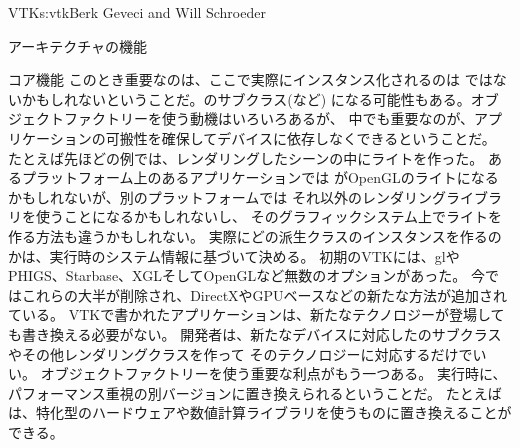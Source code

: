 \begin{aosachapter}{VTK}{s:vtk}{Berk Geveci and Will Schroeder}
\begin{aosasect1}{アーキテクチャの機能}
\begin{aosasect2}{コア機能}
このとき重要なのは、ここで実際にインスタンス化されるのは
ではないかもしれないということだ。のサブクラス(など)
になる可能性もある。オブジェクトファクトリーを使う動機はいろいろあるが、
中でも重要なのが、アプリケーションの可搬性を確保してデバイスに依存しなくできるということだ。
たとえば先ほどの例では、レンダリングしたシーンの中にライトを作った。
あるプラットフォーム上のあるアプリケーションでは
がOpenGLのライトになるかもしれないが、別のプラットフォームでは
それ以外のレンダリングライブラリを使うことになるかもしれないし、
そのグラフィックシステム上でライトを作る方法も違うかもしれない。
実際にどの派生クラスのインスタンスを作るのかは、実行時のシステム情報に基づいて決める。
初期のVTKには、glやPHIGS、Starbase、XGLそしてOpenGLなど無数のオプションがあった。
今ではこれらの大半が削除され、DirectXやGPUベースなどの新たな方法が追加されている。
VTKで書かれたアプリケーションは、新たなテクノロジーが登場しても書き換える必要がない。
開発者は、新たなデバイスに対応したのサブクラスやその他レンダリングクラスを作って
そのテクノロジーに対応するだけでいい。
オブジェクトファクトリーを使う重要な利点がもう一つある。
実行時に、パフォーマンス重視の別バージョンに置き換えられるということだ。
たとえばは、特化型のハードウェアや数値計算ライブラリを使うものに置き換えることができる。


\end{aosasect2}
\end{aosasect1}
\end{aosachapter}

